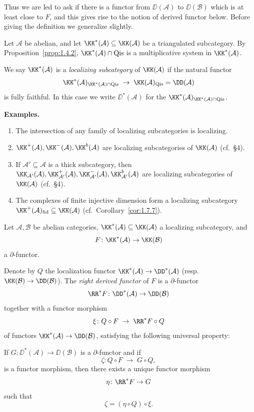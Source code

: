 Thus we are led to ask if there is a functor from $\DD(\mathcal{A})$ to $\DD(\mathcal{B})$ which is at least close to $F$, and this gives rise to the notion of derived functor below. Before giving the definition we generalize slightly.

\begin{definition*}
Let $\mathcal{A}$ be abelian, and let $\KK^*(\mathcal{A})\subseteq\KK(\mathcal{A})$ be a triangulated subcategory. By Proposition~\ref{prop:1.4.2}, $\KK^*(\mathcal{A})\cap\operatorname{Qis}$ is a multiplicative system in $\KK^*(\mathcal{A})$.

We say $\KK^*(\mathcal{A})$ is a \emph{localizing subcategory} of $\KK(\mathcal{A})$ if the natural functor
\[
\KK^*(\mathcal{A})_{\KK^*(\mathcal{A})\cap\operatorname{Qis}}
\;\to\;
\KK(\mathcal{A})_{\operatorname{Qis}} = \DD(\mathcal{A})
\]
is fully faithful. In this case we write $\DD^*(\mathcal{A})$ for the $\KK^*(\mathcal{A})_{\KK^*(\mathcal{A})\cap\operatorname{Qis}}$.
\end{definition*}

\textbf{Examples.}
\begin{enumerate}
\item The intersection of any family of localizing subcategories is localizing.
\item $\KK^+(\mathcal{A}),\KK^-(\mathcal{A}),\KK^b(\mathcal{A})$ are localizing subcategories of $\KK(\mathcal{A})$ (cf.\ \S4).
\item If $\mathcal{A}'\subseteq\mathcal{A}$ is a thick subcategory, then $\KK_{\mathcal{A}'}(\mathcal{A}),\KK_{\mathcal{A}'}^+(\mathcal{A}),\KK_{\mathcal{A}'}^-(\mathcal{A}),\KK_{\mathcal{A}'}^b(\mathcal{A})$ are localizing subcategories of $\KK(\mathcal{A})$ (cf.\ \S4).
\item The complexes of finite injective dimension form a localizing subcategory $\KK^+(\mathcal{A})_{\mathrm{fid}}\subseteq\KK(\mathcal{A})$ (cf.\ Corollary~\ref{cor:1.7.7}).
\end{enumerate}

\begin{definition*}
Let $\mathcal{A},\mathcal{B}$ be abelian categories, $\KK^*(\mathcal{A})\subseteq\KK(\mathcal{A})$ a localizing subcategory, and
\[
F\colon\KK^*(\mathcal{A})\to\KK(\mathcal{B})
\]
a $\partial$-functor.

Denote by $Q$ the localization functor $\KK^*(\mathcal{A})\to\DD^*(\mathcal{A})$ (resp.\ $\KK(\mathcal{B})\to\DD(\mathcal{B})$). The \emph{right derived functor} of $F$ is a  $\partial$-functor
\[
\RR^*F\colon\DD^*(\mathcal{A})\to\DD(\mathcal{B})
\]
together with a functor morphism
\[
\xi\colon Q\circ F \;\to\; \RR^*F\circ Q
\]
of functors $\KK^*(\mathcal{A})\to\DD(\mathcal{B})$, satisfying the following universal property:

If $G\colon\DD^*(\mathcal{A})\to\DD(\mathcal{B})$ is a $\partial$-functor and if
\[
\zeta\colon Q\circ F \;\to\; G\circ Q,
\]
is a functor morphism, then there exists a unique functor morphism
\[
\eta\colon \RR^*F \to G
\]
such that
\[
\zeta = (\eta\circ Q)\circ \xi.
\]
\end{definition*}

